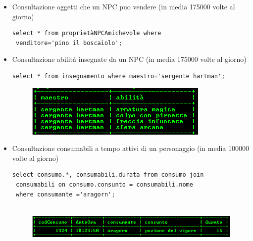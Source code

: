 \begin{itemize}
\item Consultazione oggetti che un NPC puo vendere (in media 175000 volte al giorno)

\begin{verbatim}
select * from proprietàNPCAmichevole where
 venditore='pino il boscaiolo';

\end{verbatim}
\item Consultazione abilità insegnate da un NPC (in media 175000 volte al giorno)

\begin{verbatim}
select * from insegnamento where maestro='sergente hartman';

\end{verbatim}

\begin{figure}[H]
\centering
\includegraphics[width=0.7\linewidth]{./immagini/immquery/9-abilitainsegnate}
\caption{}
\label{fig:9-abilitainsegnate}
\end{figure}

\item Consultazione consumabili a tempo attivi di un personaggio (in media 100000 volte al giorno)

\begin{verbatim}
select consumo.*, consumabili.durata from consumo join
 consumabili on consumo.consunto = consumabili.nome
 where consumante ='aragorn';
 
\end{verbatim}

\begin{figure}[H]
\centering
\includegraphics[width=0.7\linewidth]{./immagini/immquery/10-consumati}
\caption{}
\label{fig:10-consumati}
\end{figure}

\end{itemize}
